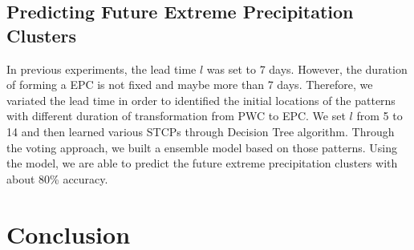 \documentclass{acm_proc_article-sp}
\begin{document}
\subsection{Predicting Future Extreme Precipitation Clusters}
In previous experiments, the lead time $l$ was set to 7 days. However, the duration of forming a EPC is not fixed and maybe more than 7 days. Therefore, we variated the lead time in order to identified the initial locations of the patterns with different duration of transformation from PWC to EPC. We set $l$ from 5 to 14 and then learned various STCPs through Decision Tree algorithm. Through the voting approach, we built a ensemble model based on those patterns. Using the model, we are able to predict the future extreme precipitation clusters with about 80\% accuracy.        

\section{Conclusion}
\label{sec:Conclusion}


 
\balancecolumns
\end{document}
